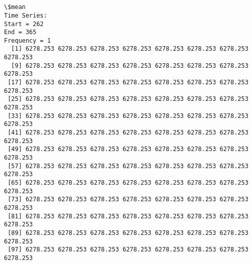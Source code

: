 \documentclass[11pt]{article}
\begin{document}
    \begin{center}
    \end{center}
    { \hspace*{\fill} \\}
    
    \begin{center}
    \end{center}
    { \hspace*{\fill} \\}
    
    \begin{Verbatim}[commandchars=\\\{\}]
\$mean
Time Series:
Start = 262 
End = 365 
Frequency = 1 
  [1] 6278.253 6278.253 6278.253 6278.253 6278.253 6278.253 6278.253 6278.253
  [9] 6278.253 6278.253 6278.253 6278.253 6278.253 6278.253 6278.253 6278.253
 [17] 6278.253 6278.253 6278.253 6278.253 6278.253 6278.253 6278.253 6278.253
 [25] 6278.253 6278.253 6278.253 6278.253 6278.253 6278.253 6278.253 6278.253
 [33] 6278.253 6278.253 6278.253 6278.253 6278.253 6278.253 6278.253 6278.253
 [41] 6278.253 6278.253 6278.253 6278.253 6278.253 6278.253 6278.253 6278.253
 [49] 6278.253 6278.253 6278.253 6278.253 6278.253 6278.253 6278.253 6278.253
 [57] 6278.253 6278.253 6278.253 6278.253 6278.253 6278.253 6278.253 6278.253
 [65] 6278.253 6278.253 6278.253 6278.253 6278.253 6278.253 6278.253 6278.253
 [73] 6278.253 6278.253 6278.253 6278.253 6278.253 6278.253 6278.253 6278.253
 [81] 6278.253 6278.253 6278.253 6278.253 6278.253 6278.253 6278.253 6278.253
 [89] 6278.253 6278.253 6278.253 6278.253 6278.253 6278.253 6278.253 6278.253
 [97] 6278.253 6278.253 6278.253 6278.253 6278.253 6278.253 6278.253 6278.253


\end{Verbatim}
\end{document}
